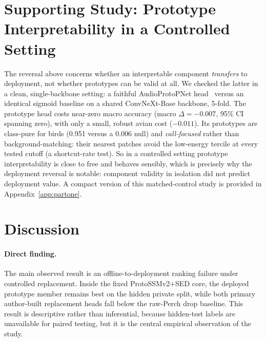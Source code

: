 \documentclass{ceurart}
\begin{document}
\section{Supporting Study: Prototype Interpretability in a Controlled Setting}
\label{sec:validity}

The reversal above concerns whether an interpretable component \emph{transfers} to deployment, not whether prototypes can be valid at all. We checked the latter in a clean, single-backbone setting: a faithful AudioProtoPNet head~\cite{heinrich2025audioprotopnet} versus an identical sigmoid baseline on a shared ConvNeXt-Base backbone, 5-fold. The prototype head costs near-zero macro accuracy (macro $\Delta = -0.007$, 95\% CI spanning zero), with only a small, robust avian cost ($-0.011$). Its prototypes are class-pure for birds (0.951 versus a 0.006 null) and \emph{call-focused} rather than background-matching: their nearest patches avoid the low-energy tercile at every tested cutoff (a shortcut-rate test). So in a controlled setting prototype interpretability is close to free and behaves sensibly, which is precisely why the deployment reversal is notable: component validity in isolation did not predict deployment value. A compact version of this matched-control study is provided in Appendix~\ref{app:partone}.



\section{Discussion}
\label{sec:discussion}

\paragraph{Direct finding.}
The main observed result is an offline-to-deployment ranking failure under controlled replacement.
Inside the fixed ProtoSSMv2+SED core, the deployed prototype member remains best on the hidden private split, while both primary author-built replacement heads fall below the raw-Perch drop baseline.
This result is descriptive rather than inferential, because hidden-test labels are unavailable for paired testing, but it is the central empirical observation of the study.
\end{document}
